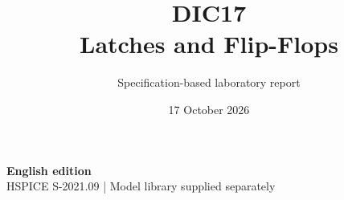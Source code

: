 \documentclass[11pt,a4paper]{article}
\title{\color{accent}DIC17\\[4pt]Latches and Flip-Flops}
\author{Specification-based laboratory report}
\date{17 October 2026}
\begin{document}
\maketitle
\begin{center}\small\textbf{English edition}\\
HSPICE S-2021.09 \quad | \quad Model library supplied separately
\end{center}


\end{document}
